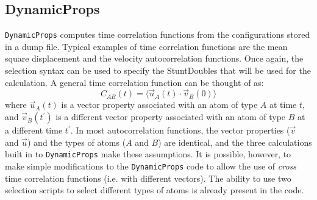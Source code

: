 \documentclass[]{book}
\begin{document}
\subsection{\label{section:DynamicProps}DynamicProps}

{\tt DynamicProps} computes time correlation functions from the
configurations stored in a dump file.  Typical examples of time
correlation functions are the mean square displacement and the
velocity autocorrelation functions.   Once again, the selection syntax
can be used to specify the StuntDoubles that will be used for the
calculation.  A general time correlation function can be thought of
as:
\begin{equation}
C_{AB}(t) = \langle \vec{u}_A(t) \cdot \vec{v}_B(0) \rangle
\end{equation}
where $\vec{u}_A(t)$ is a vector property associated with an atom of
type $A$ at time $t$, and $\vec{v}_B(t^{\prime})$ is a different vector
property associated with an atom of type $B$ at a different time
$t^{\prime}$.  In most autocorrelation functions, the vector properties
($\vec{v}$ and $\vec{u}$) and the types of atoms ($A$ and $B$) are
identical, and the three calculations built in to {\tt DynamicProps}
make these assumptions.  It is possible, however, to make simple
modifications to the {\tt DynamicProps} code to allow the use of {\it
cross} time correlation functions (i.e. with different vectors).  The
ability to use two selection scripts to select different types of
atoms is already present in the code.
\end{document}
